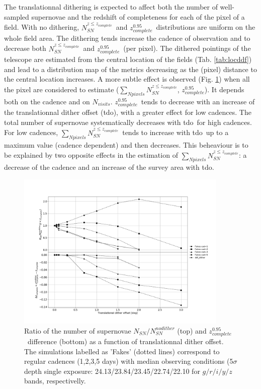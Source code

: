 \documentclass[\docopts]{\docclass}
\newcommand{\nsncomp}{{$N_{SN}^{z\leq z_{complete}}$}}
\newcommand{\sumnsncomp}{{$\sum\limits_{Npixels} N_{SN}^{z\leq z_{complete}}$}}
\newcommand{\zcompb}{\mbox{$z_{complete}^{0.95}$}}
\newcommand{\nvisits}{$N_{visits}$}
\newcommand{\doffset}{tdo}
\begin{document}
\par
The translationnal dithering is expected to affect both the number of well-sampled supernovae and the redshift of completeness for each of the pixel of a field. With no dithering, \nsncomp~and \zcompb~distributions are uniform on the whole field area. The dithering tends increase the cadence of observation and to decrease both \nsncomp~and \zcompb~(per pixel). The dithered pointings of the telescope are estimated from the central location of the fields (Tab. \ref{tab:locddf}) and lead to a distribution map of the metrics decreasing as the (pixel) distance to the central location increases. A more subtle effect is observed (Fig. \ref{fig:dither}) when all the pixel are considered to estimate (\sumnsncomp, \zcompb). It depends both on the cadence and on \nvisits. \zcompb~tends to decrease with an increase of the translationnal dither offset (\doffset), with a greater effect for low cadences. The total number of supernovae systematically decreases with \doffset~for high cadences. For low cadences, \sumnsncomp~tends to increase with \doffset~up to a maximum value (cadence dependent) and then decreases. This beheaviour is to be explained by two opposite effects in the estimation of \sumnsncomp: a decrease of the cadence and an increase of the survey area with \doffset.

\begin{figure}[htbp]
  \begin{center}
  \includegraphics[width=0.9\textwidth]{dither_ddf.png}
 \caption{Ratio of the number of supernovae $N_{SN}/N_{SN}^{nodither}$ (top) and \zcompb~difference (bottom) as a function of translationnal dither offset. The simulations labelled as 'Fakes' (dotted lines) correspond to regular cadences (1,2,3,5 days) with median observing conditions (5$\sigma$ depth single exposure: 24.13/23.84/23.45/22.74/22.10 for $g/r/i/y/z$ bands, respectivelly.}\label{fig:dither}
\end{center}
\end{figure}
\end{document}
